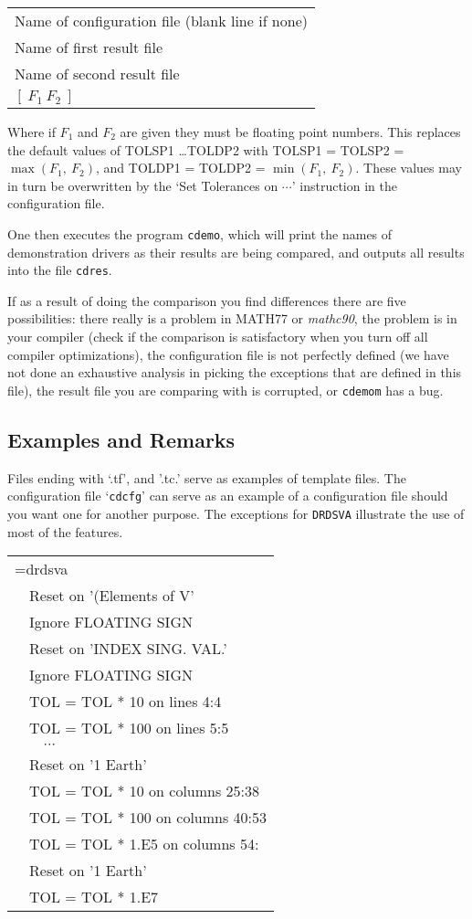 \documentclass[twoside]{MATH77}
\begin{document}
\begin{tabular}{l}
 Name of configuration file (blank line if none)\\
 Name of first result file\\
 Name of second result file\\
 $[~F_1 ~ F_2~]$
\end{tabular}

Where if $F_1$ and $F_2$ are given they must be floating point numbers.
This replaces the default values of TOLSP1 \ldots TOLDP2 with TOLSP1 =
TOLSP2 = $\max(F_1,\ F_2)$, and TOLDP1 = TOLDP2 = $\min(F_1,\ F_2)$.
These values may in turn be overwritten by the `Set Tolerances on
$\cdots$' instruction in the configuration file.

One then executes the program {\tt cdemo}, which will print the names of
demonstration drivers as their results are being compared, and outputs all
results into the file {\tt cdres}.

If as a result of doing the comparison you find differences there are five
possibilities: there really is a problem in MATH77 or {\em mathc90}, the
problem is in your compiler (check if the comparison is satisfactory when
you turn off all compiler optimizations), the configuration file is not
perfectly defined (we have not done an exhaustive analysis in picking the
exceptions that are defined in this file), the result file you are
comparing with is corrupted, or {\tt cdemom} has a bug.

\subsection{Examples and Remarks}
Files ending with `.tf', and '.tc.' serve as examples of template files.
The configuration file `{\tt cdcfg}' can serve as an example of a
configuration file should you want one for another purpose.  The
exceptions for {\tt DRDSVA} illustrate the use of most of the features.

\begin{tabular}{l}
=drdsva\\
$\quad$Reset on '(Elements of V'\\
$\quad$Ignore FLOATING SIGN\\
$\quad$Reset on 'INDEX  SING. VAL.'\\
$\quad$Ignore FLOATING SIGN\\
$\quad$TOL = TOL * 10 on lines 4:4\\
$\quad$TOL = TOL * 100 on lines 5:5\\
$\quad\quad\cdots$\\
$\quad$Reset on '1 Earth'\\
$\quad$TOL = TOL * 10 on columns 25:38\\
$\quad$TOL = TOL * 100 on columns 40:53\\
$\quad$TOL = TOL * 1.E5 on columns 54:\\
$\quad$Reset on '1 Earth'\\
$\quad$TOL = TOL * 1.E7
\end{tabular}
\end{document}
